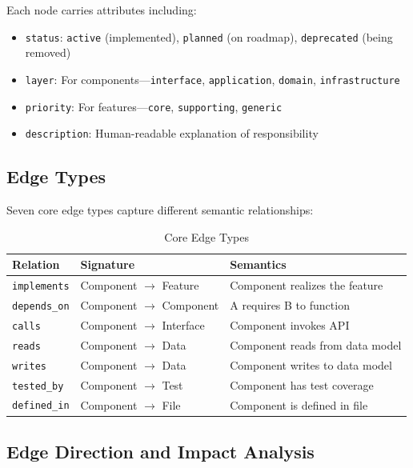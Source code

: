 \documentclass[11pt,a4paper]{article}
\begin{document}
Each node carries attributes including:
\begin{itemize}[noitemsep]
    \item \texttt{status}: \texttt{active} (implemented), \texttt{planned} (on roadmap), \texttt{deprecated} (being removed)
    \item \texttt{layer}: For components---\texttt{interface}, \texttt{application}, \texttt{domain}, \texttt{infrastructure}
    \item \texttt{priority}: For features---\texttt{core}, \texttt{supporting}, \texttt{generic}
    \item \texttt{description}: Human-readable explanation of responsibility
\end{itemize}

\subsection{Edge Types}

Seven core edge types capture different semantic relationships:

\begin{table}[h]
\centering
\caption{Core Edge Types}
\begin{tabular}{@{}lll@{}}
\toprule
\textbf{Relation} & \textbf{Signature} & \textbf{Semantics} \\
\midrule
\texttt{implements} & Component $\rightarrow$ Feature & Component realizes the feature \\
\texttt{depends\_on} & Component $\rightarrow$ Component & A requires B to function \\
\texttt{calls} & Component $\rightarrow$ Interface & Component invokes API \\
\texttt{reads} & Component $\rightarrow$ Data & Component reads from data model \\
\texttt{writes} & Component $\rightarrow$ Data & Component writes to data model \\
\texttt{tested\_by} & Component $\rightarrow$ Test & Component has test coverage \\
\texttt{defined\_in} & Component $\rightarrow$ File & Component is defined in file \\
\bottomrule
\end{tabular}
\end{table}

\subsection{Edge Direction and Impact Analysis}
\end{document}
